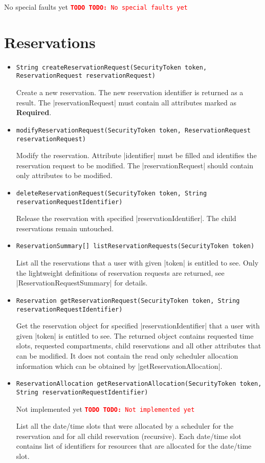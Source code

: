 \documentclass[a4paper]{report}
\newenvironment{Api}{\begin{itemize}}{\end{itemize}}
\newcommand{\ApiCode}[1]{\lstinline[style=styleApi]|#1|}
\newcommand{\ApiItem}[1]{\item #1 %

}
\newcommand{\ApiCmd}[1]{\ApiItem{\ApiCode{#1}}}
\newcommand{\ApiRequired}{{\color{blue!50!black}\textbf{Required}}}
\newenvironment{ApiFailures}{\begin{compactitem}}{\end{compactitem}}
\newcommand{\ApiFailure}[1]{\ApiItem{\ApiCode{faultCode = #1}}}
\newcommand{\TODO}[1]{%
\def\empty{}%
\def\prvniparametr{#1}%
\ifx\prvniparametr\empty%
\begingroup\tt\textcolor{red}{\noindent\textbf{TODO}}\endgroup
\else%
\begingroup\tt\textcolor{red}{\noindent\textbf{TODO:}\ #1}\endgroup
\fi%
}
\begin{document}
\TODO{No special faults yet}


\section{Reservations}

\begin{Api}

\ApiCmd{String createReservationRequest(SecurityToken token, ReservationRequest reservationRequest)}
Create a new reservation. The new reservation identifier is returned as a result. The |reservationRequest| must contain all attributes marked as \ApiRequired.

\ApiCmd{modifyReservationRequest(SecurityToken token, ReservationRequest reservationRequest)}
Modify the reservation. Attribute |identifier| must be filled and identifies the reservation request to be modified. The |reservationRequest| should contain only attributes to be modified.

\ApiCmd{deleteReservationRequest(SecurityToken token, String reservationRequestIdentifier)}
Release the reservation with specified |reservationIdentifier|. The child reservations remain untouched.

\ApiCmd{ReservationSummary[] listReservationRequests(SecurityToken token)}
List all the reservations that a user with given |token| is entitled to see. Only the lightweight definitions of reservation requests are returned, see |ReservationRequestSummary| for details.

\ApiCmd{Reservation getReservationRequest(SecurityToken token, String reservationRequestIdentifier)}
Get the reservation object for specified |reservationIdentifier| that a user with given |token| is entitled to see. The returned object contains requested time slots, requested compartments, child reservations and all other attributes that can be modified. It does not contain the read only scheduler allocation information which can be obtained by |getReservationAllocation|.

\ApiCmd{ReservationAllocation getReservationAllocation(SecurityToken token, String reservationRequestIdentifier)}
\TODO{Not implemented yet}
List all the date/time slots that were allocated by a scheduler for the reservation and for all child reservation (recursive). Each date/time slot contains list of identifiers for resources that are allocated for the date/time slot.


\end{Api}
\end{document}
